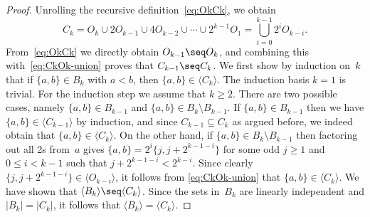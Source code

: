 %
\begin{proof}
Unrolling the recursive definition~\eqref{eq:OkCk}, we obtain
\begin{equation}
\label{eq:CkOk-union}
 C_k=O_k\cup 2O_{k-1}\cup 4O_{k-2}\cup\cdots\cup 2^{k-1}O_1=\bigcup_{i=0}^{k-1} 2^i O_{k-i}.
\end{equation}
From~\eqref{eq:OkCk} we directly obtain $O_{k-1}\seq O_k$, and combining this with~\eqref{eq:CkOk-union} proves that $C_{k-1}\seq C_k$.
%
We first show by induction on~$k$ that if $\{a,b\}\in B_k$ with $a<b$, then $\{a,b\}\in \langle C_k \rangle$.
The induction basis $k=1$ is trivial.
For the induction step we assume that $k\geq 2$.
There are two possible cases, namely $\{a,b\}\in B_{k-1}$ and $\{a,b\}\in B_k\setminus B_{k-1}$.
If $\{a,b\}\in B_{k-1}$ then we have $\{a,b\}\in \langle C_{k-1}\rangle$ by induction, and since $C_{k-1}\subseteq C_k$ as argued before, we indeed obtain that $\{a,b\}\in\langle C_k\rangle$.
On the other hand, if $\{a,b\}\in B_k\setminus B_{k-1}$ then factoring out all 2s from~$a$ gives $\{a,b\}=2^i\{j,j+2^{k-1-i}\}$ for some odd $j\geq 1$ and $0\le i<k-1$ such that $j+2^{k-1-i}<2^{k-i}$.
Since clearly $\{j,j+2^{k-1-i}\} \in \langle O_{k-i}\rangle$, it follows from \eqref{eq:CkOk-union} that $\{a,b\}\in \langle C_k \rangle$.
%
We have shown that $\langle B_k\rangle \seq \langle C_k\rangle$.
Since the sets in~$B_k$ are linearly independent and $|B_k|=|C_k|$, it follows that $\langle B_k\rangle =\langle C_k\rangle$.
\end{proof}
%
